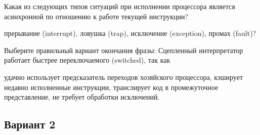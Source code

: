 \begin{questions}
\question[3] Какая из следующих типов ситуаций при исполнении процессора является асинхронной по отношению к работе текущей инструкции?
\begin{choices}
    \correctchoice прерывание (interrupt),
    \choice ловушка (trap),
    \choice исключение (exception),
    \choice промах (fault)?
\end{choices}

\question[3] Выберите правильный вариант окончания фразы: Сцепленный интерпретатор работает быстрее переключаемого (switched), так как
\begin{choices}
    \correctchoice удачно использует предсказатель переходов хозяйского процессора,
    \choice кэширует недавно исполненные инструкции,
    \choice транслирует код в промежуточное представление,
    \choice не требует обработки исключений.
\end{choices}

\end{questions}

\subsection*{Вариант 2}

